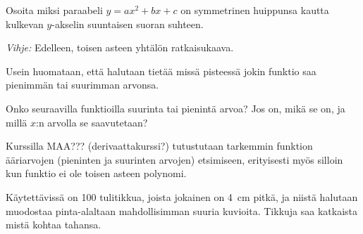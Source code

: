 \begin{tehtavasivu}
\begin{tehtava}
Osoita miksi paraabeli $y = ax^2 +bx +c$ on symmetrinen huippunsa kautta kulkevan $y$-akselin suuntaisen suoran suhteen.
\begin{vastaus}
    \emph{Vihje:} Edelleen, toisen asteen yhtälön ratkaisukaava.
\end{vastaus}
\end{tehtava}

\begin{tehtava}
Usein huomataan, että halutaan tietää missä pisteessä jokin funktio saa pienimmän tai suurimman arvonsa.

Onko seuraavilla funktioilla suurinta tai pienintä arvoa? Jos on, mikä se on, ja millä $x$:n arvolla se saavutetaan?

Kurssilla MAA??? (derivaattakurssi?) tutustutaan tarkemmin funktion ääriarvojen (pieninten ja suurinten arvojen) etsimiseen, erityisesti myös silloin kun funktio ei ole toisen asteen polynomi.
	\begin{vastaus}
	\end{vastaus}
\end{tehtava}


\begin{tehtava}
Käytettävissä on 100 tulitikkua, joista jokainen on 4~cm pitkä, ja niistä halutaan muodostaa pinta-alaltaan mahdollisimman suuria kuvioita. Tikkuja saa katkaista mistä kohtaa tahansa.
	\begin{vastaus}
	\end{vastaus}
\end{tehtava}


\end{tehtavasivu}
